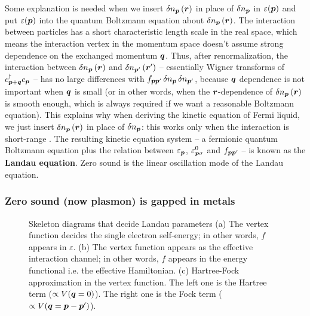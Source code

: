 \documentclass[hyperref, a4paper]{article}
\newcommand*{\concept}[1]{{\textbf{#1}}}
\begin{document}
Some explanation is needed when we insert $\var{n_{\vb*{p}}}(\vb*{r})$
in place of $\var{n_{\vb*{p}}}$ in $\varepsilon(\vb*{p})$
and put $\varepsilon(\vb*{p})$ into the quantum Boltzmann equation about $\var{n_{\vb*{p}}}(\vb*{r})$.
The interaction between particles has 
a short characteristic length scale in the real space,
which means the interaction vertex in the momentum space 
doesn't assume strong dependence on the exchanged momentum $\vb*{q}$.
Thus, after renormalization, the interaction between $\var{n}_{\vb*{p}}(\vb*{r})$
and $\var{n}_{\vb*{p}'} (\vb*{r}')$
-- essentially Wigner transforms of $c^\dagger_{\vb*{p} + \vb*{q}} c_{\vb*{p}}$ --
has no large differences with 
$f_{\vb*{p} \vb*{p}'} \var{n}_{\vb*{p}} \var{n}_{\vb*{p}'}$,
because $\vb*{q}$ dependence is not important when $\vb*{q}$ is small 
(or in other words, when the $\vb*{r}$-dependence of $\var{n_{\vb*{p}}}(\vb*{r})$
is smooth enough, which is always required if we want a reasonable Boltzmann equation).
This explains why when deriving the kinetic equation of Fermi liquid, 
we just insert $\var{n}_{\vb*{p}}(\vb*{r})$ in place of $\var{n}_{\vb*{p}}$:
this works only when the interaction is short-range
\cite{pines2018theory}.
The resulting kinetic equation system -- 
a fermionic quantum Boltzmann equation 
plus the relation between $\varepsilon_{\vb*{p}}$, 
$\varepsilon_{\vb*{p} \sigma}^0$ and $f_{\vb*{p} \vb*{p}'}$ -- 
is known as the \concept{Landau equation}.
Zero sound is the linear oscillation mode of the Landau equation.

\subsubsection{Zero sound (now plasmon) is gapped in metals}

\begin{figure}
    \centering
    
    \caption{Skeleton diagrams that decide Landau parameters 
    (a) The vertex function decides the single electron self-energy; 
    in other words, $f$ appears in $\varepsilon$.
    (b) The vertex function appears as the effective interaction channel; 
    in other words, $f$ appears in the energy functional i.e. the effective Hamiltonian.
    (c) Hartree-Fock approximation in the vertex function.
    The left one is the Hartree term ($\propto V(\vb*{q} = 0)$).
    The right one is the Fock term ($\propto V(\vb*{q} = \vb*{p} - \vb*{p}')$).}
    \label{fig:hf-vertex}
\end{figure}
\end{document}
